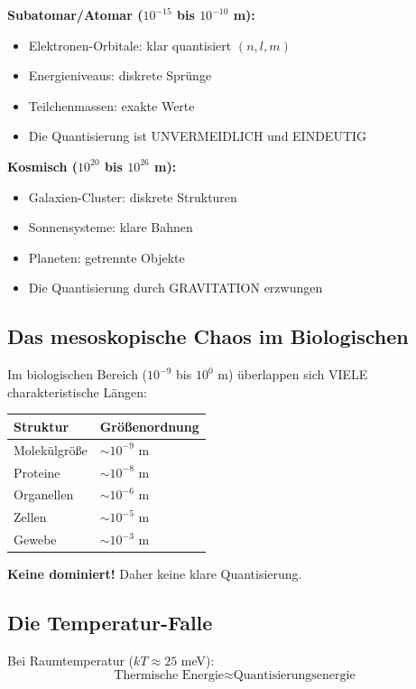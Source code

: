 	\textbf{Subatomar/Atomar ($10^{-15}$ bis $10^{-10}$ m):}
	\begin{itemize}
		\item Elektronen-Orbitale: klar quantisiert $(n, l, m)$
		\item Energieniveaus: diskrete Sprünge
		\item Teilchenmassen: exakte Werte
		\item Die Quantisierung ist UNVERMEIDLICH und EINDEUTIG
	\end{itemize}
	
	\textbf{Kosmisch ($10^{20}$ bis $10^{26}$ m):}
	\begin{itemize}
		\item Galaxien-Cluster: diskrete Strukturen
		\item Sonnensysteme: klare Bahnen
		\item Planeten: getrennte Objekte
		\item Die Quantisierung durch GRAVITATION erzwungen
	\end{itemize}
	
	\subsection{Das mesoskopische Chaos im Biologischen}
	
	Im biologischen Bereich ($10^{-9}$ bis $10^0$ m) überlappen sich VIELE charakteristische Längen:
	
	\begin{center}
		\begin{tabular}{ll}
			\toprule
			Struktur & Größenordnung\\
			\midrule
			Molekülgröße & $\sim 10^{-9}$ m\\
			Proteine & $\sim 10^{-8}$ m\\
			Organellen & $\sim 10^{-6}$ m\\
			Zellen & $\sim 10^{-5}$ m\\
			Gewebe & $\sim 10^{-3}$ m\\
			\bottomrule
		\end{tabular}
	\end{center}
	
	\textbf{Keine dominiert!} Daher keine klare Quantisierung.
	
	\subsection{Die Temperatur-Falle}
	
	Bei Raumtemperatur ($kT \approx 25$ meV):
	\begin{equation}
		\text{Thermische Energie} \approx \text{Quantisierungsenergie}
	\end{equation}
	
